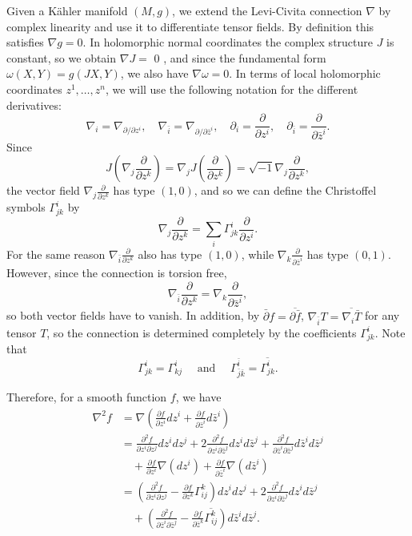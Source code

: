 \documentclass{ctexart}
\begin{document}
Given a Kähler manifold $(M, g)$, we extend the Levi-Civita connection $\nabla$ by complex linearity and use it to differentiate tensor fields. 
By definition this satisfies $\nabla g=0$. In holomorphic normal coordinates the complex structure $J$ is constant, so we obtain $\nabla J=$ 0 , 
and since the fundamental form $\omega(X, Y)=g(J X, Y)$, we also have $\nabla \omega=0$. In terms of local holomorphic coordinates $z^1, \ldots, z^n$, 
we will use the following notation for the different derivatives:
$$
\nabla_i=\nabla_{\partial / \partial z^i}, \quad \nabla_{\bar{i}}=\nabla_{\partial / \partial \bar{z}^i}, \quad \partial_i=\frac{\partial}{\partial z^i}, 
\quad \partial_{\bar{i}}=\frac{\partial}{\partial \bar{z}^i} .
$$
Since
$$
J\left(\nabla_j \frac{\partial}{\partial z^k}\right)=\nabla_j J\left(\frac{\partial}{\partial z^k}\right)=\sqrt{-1} \nabla_j \frac{\partial}{\partial z^k},
$$
the vector field $\nabla_j \frac{\partial}{\partial z^k}$ has type $(1,0)$, and so we can define the Christoffel symbols $\Gamma_{j k}^i$ by
$$
\nabla_j \frac{\partial}{\partial z^k}=\sum_i \Gamma_{j k}^i \frac{\partial}{\partial z^i} .
$$
For the same reason $\nabla_{\bar{i}} \frac{\partial}{\partial z^k}$ also has type $(1,0)$, while $\nabla_k \frac{\partial}{\partial \bar{z}^i}$ has type $(0,1)$. 
However, since the connection is torsion free,
$$
\nabla_{\bar{i}} \frac{\partial}{\partial z^k}=\nabla_k \frac{\partial}{\partial \bar{z}^i},
$$
so both vector fields have to vanish. In addition, by $\bar{\partial}f=\overline{\partial\bar{f}}$, $\nabla_{\bar{i}} T=\overline{\nabla_i \bar{T}}$ for any tensor $T$, 
so the connection is determined completely by the coefficients $\Gamma_{j k}^i$. Note that
$$
\Gamma_{j k}^i=\Gamma_{k j}^i \quad \text { and } \quad \Gamma_{\bar{j} \bar{k}}^{\bar{i}}=\overline{\Gamma_{j k}^i} .
$$

Therefore, for a smooth function $f$, we have
$$
\begin{aligned}
\nabla^2 f &=\nabla\left(\frac{\partial f}{\partial z^i} d z^i + \frac{\partial f}{\partial \bar{z}^i} d \bar{z}^i\right) \\
&=\frac{\partial^2 f}{\partial z^i \partial z^j} d z^i d z^j + 2\frac{\partial^2 f}{\partial z^i \partial \bar{z}^j} d z^i d \bar{z}^j 
  + \frac{\partial^2 f}{\partial \bar{z}^i \partial \bar{z}^j} d \bar{z}^i d \bar{z}^j \\
&\quad  +\frac{\partial f}{\partial z^i} \nabla\left(d z^i\right)+\frac{\partial f}{\partial \bar{z}^i} \nabla\left(d \bar{z}^i\right) \\
&=\left(\frac{\partial^2 f}{\partial z^i \partial z^j}-\frac{\partial f}{\partial z^k} \Gamma_{i j}^k\right) d z^i d z^j 
  + 2\frac{\partial^2 f}{\partial z^i \partial \bar{z}^j} d z^i d \bar{z}^j \\
&\quad  + \left(\frac{\partial^2 f}{\partial \bar{z}^i \partial \bar{z}^j}-\frac{\partial f}{\partial \bar{z}^k} \overline{\Gamma_{i j}^k}\right) 
  d \bar{z}^i d \bar{z}^j.
\end{aligned}
$$
\end{document}
